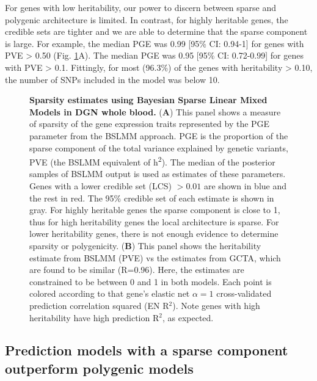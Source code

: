 \documentclass[10pt,letterpaper]{article}
\begin{document}
For genes with low heritability, our power to discern between sparse and polygenic architecture is limited. 
In contrast, for highly heritable genes, the credible sets are tighter and we are able to determine that the sparse component is large. For example, the median PGE was 0.99 [95\% CI: 0.94-1] for genes with PVE \textgreater{} 0.50 (Fig. \ref{fig-dgn-bslmm}A). The median PGE was 0.95 [95\% CI: 0.72-0.99] for genes with PVE \textgreater{} 0.1. Fittingly, for most (96.3\%) of the genes with heritability \textgreater{} 0.10, the number of SNPs included in the model was below 10.

\begin{figure}[H]
\caption{{\bf Sparsity estimates using Bayesian Sparse Linear Mixed Models in DGN whole blood.} 
(\textbf{A}) This panel shows a measure of sparsity of the gene expression traits represented by the PGE parameter from the BSLMM approach. PGE is the proportion of the sparse component of the total variance explained by genetic variants, PVE (the BSLMM equivalent of h\textsuperscript{2}). The median of the posterior samples of BSLMM output is used as estimates of these parameters.
Genes with a lower credible set (LCS) $>0.01$ are shown in blue and the rest in red. The 95\% credible set of each estimate is shown in gray. 
 For highly heritable genes the sparse component is close to 1, thus for high heritability genes the local architecture is sparse. For lower heritability genes, there is not enough evidence to determine sparsity or polygenicity. (\textbf{B}) This panel shows the heritability estimate from BSLMM (PVE) vs the estimates from GCTA, which are found to be similar (R=0.96). Here, the estimates are constrained to be between 0 and 1 in both models. Each point is colored according to that gene's elastic net \(\alpha=1\) cross-validated prediction correlation squared (EN R$^2$). Note genes with high heritability have high prediction R$^2$, as expected.
}
\label{fig-dgn-bslmm}
\end{figure}


\subsection*{Prediction models with a sparse component outperform polygenic models}\label{the-effect-of-local-genetic-variation-on-gene-expression-is-sparse-rather-than-polygenic}
\end{document}
